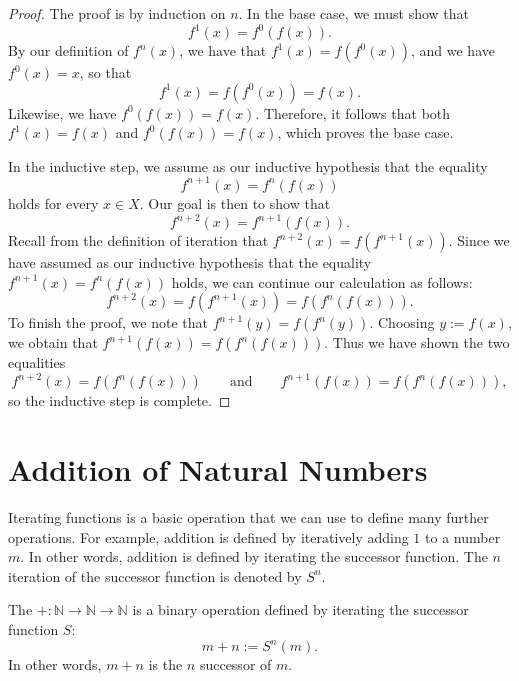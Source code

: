 \begin{proof}
  The proof is by induction on $n$. In the base case, we must show that
  \begin{equation*}
    f^1(x) = f^0(f(x)).
  \end{equation*}
  By our definition of $f^n(x)$, we have that $f^1(x)=f(f^0(x))$, and we have $f^0(x)=x$, so that
  \begin{equation*}
    f^1(x)=f(f^0(x))=f(x).
  \end{equation*}
  Likewise, we have $f^0(f(x))=f(x)$. Therefore, it follows that both $f^1(x)=f(x)$ and $f^0(f(x))=f(x)$, which proves the base case.

  In the inductive step, we assume as our inductive hypothesis that the equality
  \begin{equation*}
    f^{n+1}(x)=f^n(f(x))
  \end{equation*}
  holds for every $x\in X$. Our goal is then to show that
  \begin{equation*}
    f^{n+2}(x)=f^{n+1}(f(x)).
  \end{equation*}
  Recall from the definition of iteration that $f^{n+2}(x)=f(f^{n+1}(x))$. Since we have assumed as our inductive hypothesis that the equality $f^{n+1}(x)=f^n(f(x))$ holds, we can continue our calculation as follows:
  \begin{equation*}
    f^{n+2}(x) = f(f^{n+1}(x)) = f(f^n(f(x))).
  \end{equation*}
  To finish the proof, we note that $f^{n+1}(y)=f(f^n(y))$. Choosing $y:=f(x)$, we obtain that $f^{n+1}(f(x))=f(f^n(f(x)))$. Thus we have shown the two equalities
  \begin{equation*}
    f^{n+2}(x) = f(f^n(f(x))) \qquad\text{and}\qquad f^{n+1}(f(x)) = f(f^n(f(x))),
  \end{equation*}
  so the inductive step is complete.
\end{proof}

\section{Addition of Natural Numbers}

Iterating functions is a basic operation that we can use to define many further operations. For example, addition is defined by iteratively adding $1$ to a number $m$. In other words, addition is defined by iterating the successor function. The $n$\supth{} iteration of the successor function is denoted by $S^n$.

\begin{definition}
  The  ${+}:\mathbb{N}\to\mathbb{N}\to\mathbb{N}$ is a binary operation defined by iterating the successor function $S$:
  \begin{equation*}
    m+n := S^n(m).
  \end{equation*}
  In other words, $m+n$ is the $n$\supth{} successor of $m$.
\end{definition}

